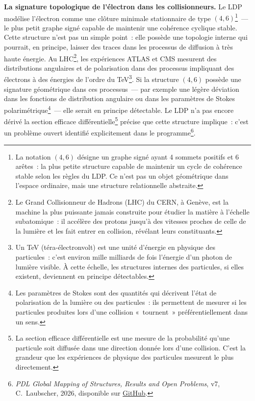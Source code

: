 \documentclass[12pt, a4paper, openright]{book}
\begin{document}
\textbf{La signature topologique de l'électron dans les collisionneurs.} Le LDP modélise l'électron comme une clôture minimale stationnaire de type $(4,6)$\footnote{La notation $(4,6)$ désigne un graphe signé ayant 4 sommets positifs et 6 arêtes~: la plus petite structure capable de maintenir un cycle de cohérence stable selon les règles du LDP. Ce n'est pas un objet géométrique dans l'espace ordinaire, mais une structure relationnelle abstraite.}~--- le plus petit graphe signé capable de maintenir une cohérence cyclique stable. Cette structure n'est pas un simple point~: elle possède une topologie interne qui pourrait, en principe, laisser des traces dans les processus de diffusion à très haute énergie. Au LHC\footnote{Le Grand Collisionneur de Hadrons (LHC) du CERN, à Genève, est la machine la plus puissante jamais construite pour étudier la matière à l'échelle subatomique~: il accélère des protons jusqu'à des vitesses proches de celle de la lumière et les fait entrer en collision, révélant leurs constituants.}, les expériences ATLAS et CMS mesurent des distributions angulaires et de polarisation dans des processus impliquant des électrons à des énergies de l'ordre du TeV\footnote{Un TeV (téra-électronvolt) est une unité d'énergie en physique des particules~: c'est environ mille milliards de fois l'énergie d'un photon de lumière visible. À cette échelle, les structures internes des particules, si elles existent, deviennent en principe détectables.}. Si la structure $(4,6)$ possède une signature géométrique dans ces processus~--- par exemple une légère déviation dans les fonctions de distribution angulaire ou dans les paramètres de Stokes polarimétrique\footnote{Les paramètres de Stokes sont des quantités qui décrivent l'état de polarisation de la lumière ou des particules~: ils permettent de mesurer si les particules produites lors d'une collision «~tournent~» préférentiellement dans un sens.}~--- elle serait en principe détectable. Le LDP n'a pas encore dérivé la section efficace différentielle\footnote{La section efficace différentielle est une mesure de la probabilité qu'une particule soit diffusée dans une direction donnée lors d'une collision. C'est la grandeur que les expériences de physique des particules mesurent le plus directement.} précise que cette structure implique~: c'est un problème ouvert identifié explicitement dans le programme\footnote{\textit{PDL Global Mapping of Structures, Results and Open Problems}, v7, C.~Laubscher, 2026, disponible sur \href{https://github.com/laubscher-lab/PDL-framework}{GitHub}.}.
\end{document}

